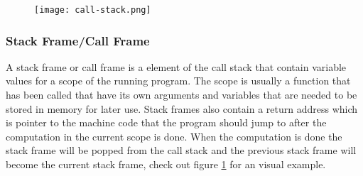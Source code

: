 \begin{figure}[h]
    \centering
    \texttt{[image: call-stack.png]}
    \label{fig:callstack}
\end{figure}


\subsubsection{Stack Frame/Call Frame}
A stack frame or call frame is a element of the call stack that contain variable values for a scope of the running program.
The scope is usually a function that has been called that have its own arguments and variables that are needed to be stored in memory for later use.
Stack frames also contain a return address which is pointer to the machine code that the program should jump to after the computation in the current scope is done.
When the computation is done the stack frame will be popped from the call stack and the previous stack frame will become the current stack frame, check out figure \ref{fig:callstack} for an visual example.


